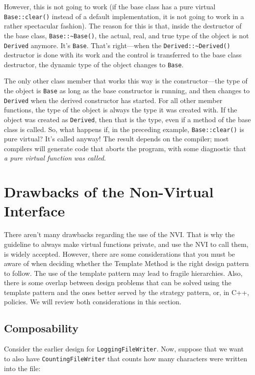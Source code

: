 However, this is not going to work (if the base class has a pure virtual \texttt{Base::clear()} instead of a default implementation, it is not going to work in a rather spectacular fashion). The reason for this is that, inside the destructor of the base class, \texttt{Base::\textasciitilde{}Base()}, the actual, real, and true type of the object is not \texttt{Derived} anymore. It's \texttt{Base}. That's right---when the \texttt{Derived::\textasciitilde{}Derived()} destructor is done with its work and the control is transferred to the base class destructor, the dynamic type of the object changes to \texttt{Base}.

The only other class member that works this way is the constructor---the type of the object is \texttt{Base} as long as the base constructor is running, and then changes to \texttt{Derived} when the derived constructor has started. For all other member functions, the type of the object is always the type it was created with. If the object was created as \texttt{Derived}, then that is the type, even if a method of the base class is called. So, what happens if, in the preceding example, \texttt{Base::clear()} is pure virtual? It's called anyway! The result depends on the compiler; most compilers will generate code that aborts the program, with some diagnostic that \emph{a pure virtual function} \emph{was called}.

\section{Drawbacks of the Non-Virtual Interface}

There aren't many drawbacks regarding the use of the NVI. That is why the guideline to always make virtual functions private, and use the NVI to call them, is widely accepted. However, there are some considerations that you must be aware of when deciding whether the Template Method is the right design pattern to follow. The use of the template pattern may lead to fragile hierarchies. Also, there is some overlap between design problems that can be solved using the template pattern and the ones better served by the strategy pattern, or, in C++, policies. We will review both considerations in this section.

\subsection{Composability}

Consider the earlier design for \texttt{LoggingFileWriter}. Now, suppose that we want to also have \texttt{CountingFileWriter} that counts how many characters were written into the file:

